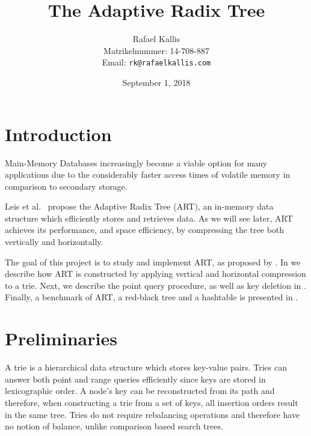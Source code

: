 \documentclass[abstracton,12pt]{scrartcl}
\title{The Adaptive Radix Tree}
\author{
    Rafael Kallis\\[-5pt]
    \scriptsize Matrikelnummer: 14-708-887\\[-5pt]
    \scriptsize Email: \texttt{rk@rafaelkallis.com}
}
\date{\vspace*{2cm}September 1, 2018}
\theoremstyle{definition}
\begin{document}
\maketitle





\newpage
\section{Introduction}

Main-Memory Databases increasingly become a viable option for many applications
due to the considerably faster access times of volatile memory 
in comparison to secondary storage.

Leis et al.\ \cite{leis2013adaptive} propose the Adaptive Radix Tree (ART), an in-memory
data structure which efficiently stores and retrieves data.
As we will see later, ART achieves its performance, and space
efficiency, by compressing the tree both vertically and horizontally.

The goal of this project is to study and implement ART, as proposed by 
\cite{leis2013adaptive}. 
In  we describe how ART is constructed by applying 
vertical and horizontal compression to a trie.
Next, we describe the point query procedure, as well as 
key deletion in .
Finally, a benchmark of ART, a red-black tree and a hashtable
is presented in .

\section{Preliminaries}
\label{sec:preliminaries}

A trie \cite{fredkin1960trie} is a hierarchical data structure which
stores key-value pairs. Tries can answer both point and range queries 
efficiently since keys are stored in lexicographic order.
A node's key can be reconstructed from its path and therefore, when 
constructing a trie from a set of keys, all insertion orders result in the 
same tree. Tries do not require rebalancing operations and therefore have 
no notion of balance, unlike comparison based search trees.
\end{document}
